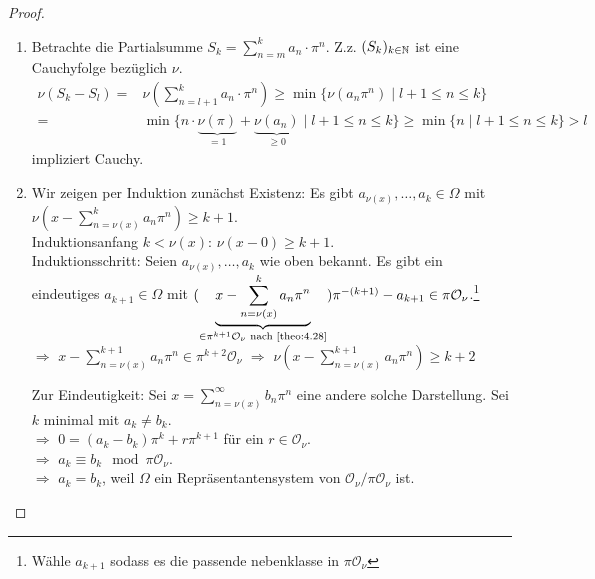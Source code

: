 \documentclass[../main.tex]{subfiles}
\begin{document}
\begin{proof}
    \begin{enumerate}[label=(\alph*)]
        \item Betrachte die Partialsumme $S_k = \sum_{n=m}^k a_n\cdot \pi^n$.
        Z.z. $(S_k)_{k\in\mathbb{N}}$ ist eine Cauchyfolge bezüglich $\nu$.
        \begin{align*}
            \nu(S_k-S_l) =& \nu\left(\sum_{n=l+1}^k a_n\cdot \pi^n\right)
            \geq \min\{\nu\left(a_n\pi^n\right)\mid l+1\leq n\leq k\}\\
            =& \min\{n\cdot \underbrace{\nu(\pi)}_{=1}+\underbrace{\nu(a_n)}_{\geq 0}\mid l+1\leq n \leq k\} 
            \geq \min\{n\mid l+1\leq n \leq k\} >l
        \end{align*}
        impliziert Cauchy.
        \item Wir zeigen per Induktion zunächst Existenz: 
        Es gibt $a_{\nu(x)},\dots,a_k\in \Omega$ mit $\nu\left(x-\sum_{n=\nu(x)}^k a_n\pi^n\right)\geq {k+1}$.\\
        Induktionsanfang $k<\nu(x)$: 
        $\nu(x-0)\geq k+1$\checkmark.\\
        Induktionsschritt: Seien $a_{\nu(x)}, \dots, a_k$ wie oben bekannt.
        Es gibt ein eindeutiges ${a_{k+1}\in \Omega}$ mit $(\underbrace{x-\sum_{n=\nu(x)}^k a_n\pi^n}_{\in \pi^{k+1}\mathcal{O}_\nu\text{ nach \ref{theo:4.28}}})\pi^{-(k+1)}-a_{k+1}\in\pi \mathcal{O}_\nu$.\footnote{Wähle $a_{k+1}$ sodass es die passende nebenklasse in $\pi\mathcal{O}_\nu$}\\
        $\Longrightarrow$ $x-\sum_{n=\nu(x)}^{k+1} a_n\pi^n\in \pi^{k+2}\mathcal{O}_\nu$
        $\Longrightarrow$ $\nu(x-\sum_{n=\nu(x)}^{k+1} a_n\pi^n)\geq k+2$

        Zur Eindeutigkeit:
        Sei $x=\sum_{n=\nu(x)}^\infty b_n \pi^n$ eine andere solche Darstellung.
        Sei $k$ minimal mit $a_k\neq b_k$.\\
        $\Longrightarrow$ $0=(a_k-b_k)\pi^k + r\pi^{k+1}$ für ein $r\in \mathcal{O}_\nu$.\\
        $\Longrightarrow$ $a_k\equiv b_k \mod \pi\mathcal{O}_\nu$.\\
        $\Longrightarrow$ $a_k = b_k$, weil $\Omega$ ein Repräsentantensystem von $\mathcal{O}_\nu/\pi \mathcal{O}_\nu$ ist.
    \end{enumerate}
\end{proof}
\end{document}
